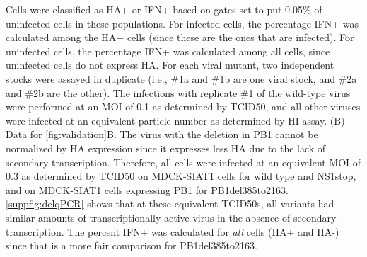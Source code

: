 \documentclass[]{asm-article}
\newcommand{\FIG}[1]{\autoref{fig:#1}}
\newcommand{\SUPPFIG}[1]{\autoref{suppfig:#1}}
\begin{document}
\begin{suppfig}
{Cells were classified as HA+ or IFN+ based on gates set to put 0.05\% of uninfected cells in these populations.
For infected cells, the percentage IFN+ was calculated among the HA+ cells (since these are the ones that are infected).
For uninfected cells, the percentage IFN+ was calculated among all cells, since uninfected cells do not express HA.
For each viral mutant, two independent stocks were assayed in duplicate (i.e., \#1a and \#1b are one viral stock, and \#2a and \#2b are the other).
The infections with replicate \#1 of the wild-type virus were performed at an MOI of 0.1 as determined by TCID50, and all other viruses were infected at an equivalent particle number as determined by HI assay. 
(B)
Data for \FIG{validation}B.
The virus with the deletion in PB1 cannot be normalized by HA expression since it expresses less HA due to the lack of secondary transcription.
Therefore, all cells were infected at an equivalent MOI of 0.3 as determined by TCID50 on MDCK-SIAT1 cells for wild type and NS1stop, and on MDCK-SIAT1 cells expressing PB1 for PB1del385to2163.
\SUPPFIG{delqPCR} shows that at these equivalent TCID50s, all variants had similar amounts of transcriptionally active virus in the absence of secondary transcription.
The percent IFN+ was calculated for \emph{all} cells (HA+ and HA-) since that is a more fair comparison for PB1del385to2163.
}
\label{suppfig:validationflow}
\end{suppfig}
\end{document}
